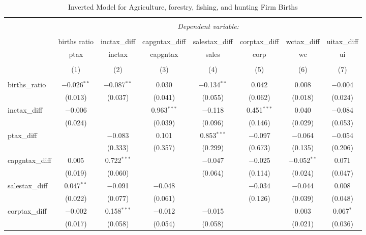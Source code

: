 
\begin{table}[!htbp] \centering 
  \caption{Inverted Model for  Agriculture, forestry, fishing, and hunting Firm Births} 
  \label{11rd} 
\footnotesize 
\begin{tabular}{@{\extracolsep{5pt}}lccccccc} 
\\[-1.8ex]\hline 
\hline \\[-1.8ex] 
 & \multicolumn{7}{c}{\textit{Dependent variable:}} \\ 
\cline{2-8} 
\\[-1.8ex] & births ratio & inctax\_diff & capgntax\_diff & salestax\_diff & corptax\_diff & wctax\_diff & uitax\_diff \\ 
 & ptax & inctax & capgntax & sales & corp & wc & ui \\ 
\\[-1.8ex] & (1) & (2) & (3) & (4) & (5) & (6) & (7)\\ 
\hline \\[-1.8ex] 
 births\_ratio & $-$0.026$^{**}$ & $-$0.087$^{**}$ & 0.030 & $-$0.134$^{**}$ & 0.042 & 0.008 & $-$0.004 \\ 
  & (0.013) & (0.037) & (0.041) & (0.055) & (0.062) & (0.018) & (0.024) \\ 
  inctax\_diff & $-$0.006 &  & 0.963$^{***}$ & $-$0.118 & 0.451$^{***}$ & 0.040 & $-$0.084 \\ 
  & (0.024) &  & (0.039) & (0.096) & (0.146) & (0.029) & (0.053) \\ 
  ptax\_diff &  & $-$0.083 & 0.101 & 0.853$^{***}$ & $-$0.097 & $-$0.064 & $-$0.054 \\ 
  &  & (0.333) & (0.357) & (0.299) & (0.673) & (0.135) & (0.206) \\ 
  capgntax\_diff & 0.005 & 0.722$^{***}$ &  & $-$0.047 & $-$0.025 & $-$0.052$^{**}$ & 0.071 \\ 
  & (0.019) & (0.060) &  & (0.064) & (0.114) & (0.024) & (0.047) \\ 
  salestax\_diff & 0.047$^{**}$ & $-$0.091 & $-$0.048 &  & $-$0.034 & $-$0.044 & 0.008 \\ 
  & (0.022) & (0.077) & (0.061) &  & (0.126) & (0.039) & (0.048) \\ 
  corptax\_diff & $-$0.002 & 0.158$^{***}$ & $-$0.012 & $-$0.015 &  & 0.003 & 0.067$^{*}$ \\ 
  & (0.017) & (0.058) & (0.054) & (0.058) &  & (0.021) & (0.036) \\ 

\end{tabular}
\end{table}
